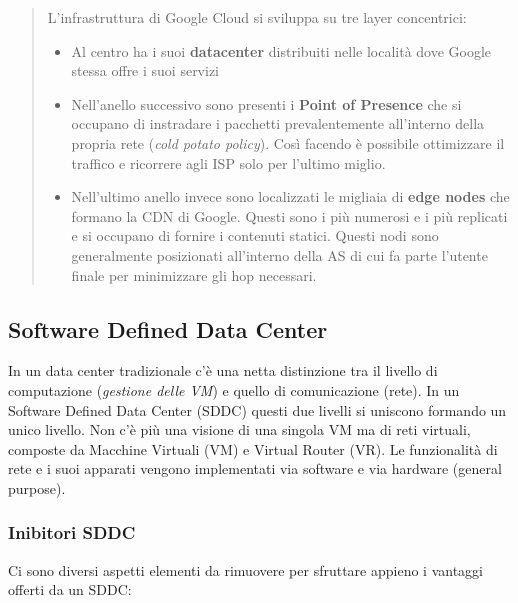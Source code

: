\documentclass{article}
\begin{document}
		\begin{quote}
		L'infrastruttura di Google Cloud si sviluppa su tre layer concentrici:
		\begin{itemize}
			\item Al centro ha i suoi \textbf{datacenter} distribuiti nelle località dove Google stessa offre i suoi servizi
			\item Nell'anello successivo sono presenti i \textbf{Point of Presence} che si occupano di instradare i pacchetti prevalentemente all'interno della propria rete (\textit{cold potato policy}). Così facendo è possibile ottimizzare il traffico e ricorrere agli ISP solo per l'ultimo miglio.
			\item Nell'ultimo anello invece sono localizzati le migliaia di \textbf{edge nodes} che formano la CDN di Google. Questi sono i più numerosi e i più replicati e si occupano di fornire i contenuti statici. Questi nodi sono generalmente posizionati all'interno della AS di cui fa parte l'utente finale per minimizzare gli hop necessari.
		\end{itemize} 
		\end{quote}
		
		\subsection{Software Defined Data Center}
		
		In un data center tradizionale c'è una netta distinzione
		tra il livello di computazione (\emph{gestione delle
		VM}) e quello di comunicazione (rete). In un
		Software Defined Data Center (SDDC) questi due
		livelli si uniscono formando un unico livello. Non c'è
		più una visione di una singola VM ma di reti virtuali,
		composte da Macchine Virtuali (VM) e
		Virtual Router (VR). Le funzionalità di
		rete e i suoi apparati vengono implementati via software
		e via hardware (general purpose).
		
		\subsubsection{Inibitori SDDC}\label{inibitori-sddc}
		
		Ci sono diversi aspetti elementi da rimuovere per
		sfruttare appieno i vantaggi offerti da un SDDC:
		
\end{document}
